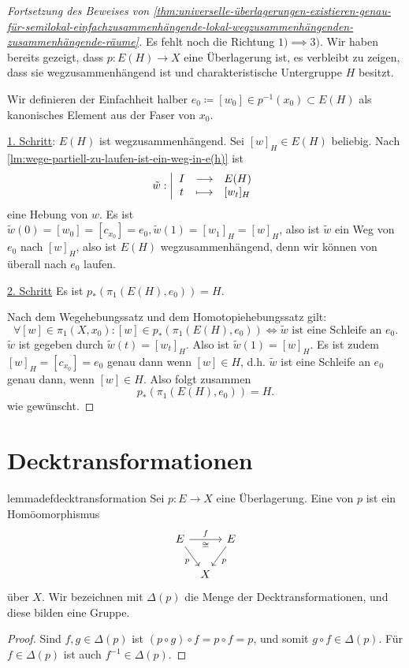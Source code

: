 \begin{proof}[Fortsetzung des Beweises von \autoref{thm:universelle-überlagerungen-existieren-genau-für-semilokal-einfachzusammenhängende-lokal-wegzusammenhängenden-zusammenhängende-räume}]
    Es fehlt noch die Richtung $1) \implies 3)$.  Wir haben bereits gezeigt, dass $p\colon  E(H) \to  X$ eine Überlagerung ist, es verbleibt zu zeigen, dass sie wegzusammenhängend ist und charakteristische Untergruppe $H$ besitzt.

    Wir definieren der Einfachheit halber $e_0\coloneqq [w_{0}]\in p^{-1} (x_0) \subset E(H)$ als kanonisches Element aus der Faser von $x_0$.

    \underline{1. Schritt}: $E(H)$ ist wegzusammenhängend. Sei  $[w]_H \in E(H)$ beliebig. Nach \autoref{lm:wege-partiell-zu-laufen-ist-ein-weg-in-e(h)} ist
        \begin{equation*}
        \tilde{w}: \left| \begin{array}{c c l} 
            I & \longrightarrow & E(H) \\
            t & \longmapsto &  [w_t]_H
        \end{array} \right.
    \end{equation*}
    eine Hebung von $w$. Es ist  $\tilde{w}(0) = [w_0] = [c_{x_0}] = e_0, \tilde{w}(1) = [w_1]_H = [w]_H$, also ist $\tilde{w}$ ein Weg von $e_0$ nach $[w]_H$, also ist  $E(H)$ wegzusammenhängend, denn wir können von überall nach  $e_0$ laufen.

    \underline{2. Schritt} Es ist $p_*(\pi_1(E(H),e_0)) = H$.

    Nach dem Wegehebungssatz und dem Homotopiehebungssatz gilt:
    \[
        \forall [w] \in \pi_1(X,x_0) \colon  [w] \in p_*(\pi_1(E(H),e_0)) \iff  \tilde{w} \text{ ist eine Schleife an $e_0$}
    .\] 
    $\tilde{w}$ ist gegeben durch  $\tilde{w}(t) = [w_t]_H$. Also ist $\tilde{w}(1) = [w]_H$. Es ist zudem $[w]_H = [c_{x_0}] = e_0$ genau dann wenn $[w]\in H$, d.h. $\tilde{w}$ ist eine Schleife an $e_0$ genau dann, wenn $[w] \in H$. Also folgt zusammen
    \[
        p_*(\pi_1(E(H),e_0)) = H
    .\] 
    wie gewünscht.
\end{proof}

\section{Decktransformationen}
\begin{restatable}[Decktransformation]{lemmadef}{decktransformation}\label{def:decktransformation}
    Sei $p\colon  E \to  X$ eine Überlagerung. Eine  von $p$ ist ein Homöomorphismus
     \[
         \begin{tikzcd}[column sep = tiny, ampersand replacement = \&]
        E \ar{rr}{f}[swap]{\cong} \ar[swap]{dr}{p} \& \& E \ar{dl}{p} \\
    \& X
    \end{tikzcd}
    \]
    über $X$.  Wir bezeichnen mit  $\Delta(p)$ die Menge der Decktransformationen, und diese bilden eine Gruppe.
\end{restatable}

\begin{proof}
    Sind $f,g\in \Delta(p)$ ist $(p \circ  g) \circ  f = p \circ  f = p$, und somit $g \circ  f \in \Delta(p)$. Für $f\in \Delta(p)$ ist auch $f^{-1}\in \Delta(p)$.
\end{proof}
